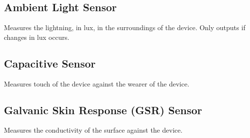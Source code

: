 \subsection{Ambient Light Sensor}
\label{sub:ambient_light_sensor}
Measures the lightning, in lux, in the surroundings of the device. Only outputs if changes in lux occurs.

\subsection{Capacitive Sensor}
\label{sub:capacitive_sensor}
Measures touch of the device against the wearer of the device.

\subsection{Galvanic Skin Response (GSR) Sensor}
\label{sub:galvanic_skin_respons_}
Measures the conductivity of the surface against the device.
